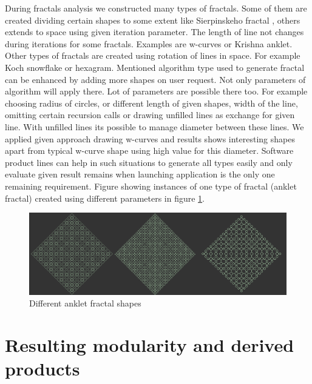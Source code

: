 \documentclass[11pt,english,a4paper,twoside]{article}
\begin{document}
During fractals analysis we constructed many types of fractals. Some of them are created dividing certain shapes to some extent like Sierpinskeho fractal \cite{pelanek_programatorska_2012}, others extends to space using given iteration parameter. The length of line not changes during iterations for some fractals. Examples are w-curves or Krishna anklet. Other types of fractals are created using rotation of lines in space. For example Koch snowflake or hexagram. Mentioned algorithm type used to generate fractal can be enhanced by adding more shapes on user request. Not only parameters of algorithm will apply there. Lot of parameters are possible there too. For example choosing radius of circles, or different length of given shapes, width of the line, omitting certain recursion calls or drawing unfilled lines as exchange for given line. With unfilled lines its possible to manage diameter between these lines. We applied given approach drawing w-curves and results shows interesting shapes apart from typical w-curve shape using high value for this diameter. Software product lines can help in such situations to generate all types easily and only evaluate given result remains when launching application is the only one remaining requirement. Figure showing instances of one type of fractal (anklet fractal) created using different parameters in figure \ref{ankletFractalTypes}.

\begin{figure}[H]  %
					\begin{center}
									\includegraphics[width=\linewidth]{fig/fractalsAnklet.png}
									\caption{Different anklet fractal shapes}
									\label{ankletFractalTypes}
					\end{center}
\end{figure}



\section{Resulting modularity and derived products} \label{resultingModularity}
\end{document}
